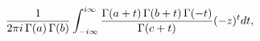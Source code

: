 \[\frac{1}{2\pi i\mathop{\Gamma\/}\nolimits\!\left(a\right)\mathop{\Gamma\/}%
\nolimits\!\left(b\right)}\int_{-i\infty}^{i\infty}\frac{\mathop{\Gamma\/}%
\nolimits\!\left(a+t\right)\mathop{\Gamma\/}\nolimits\!\left(b+t\right)\mathop%
{\Gamma\/}\nolimits\!\left(-t\right)}{\mathop{\Gamma\/}\nolimits\!\left(c+t%
\right)}(-z)^{t}dt,\]